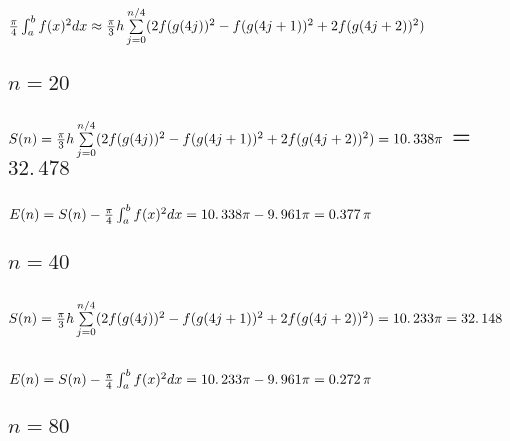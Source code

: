 \documentclass{article}
\begin{document}
\subsection{$\frac{\protect\pi }{4}\protect\int_{a}^{b}f(x)^{2}dx\approx 
\frac{\protect\pi }{3}h\sum%
\limits_{j=0}^{n/4}(2f(g(4j))^{2}-f(g(4j+1))^{2}+2f(g(4j+2))^{2})$}

\bigskip

\subsection{$n=20$}

\subsection{$S(n)=\frac{\protect\pi }{3}h\sum%
\limits_{j=0}^{n/4}(2f(g(4j))^{2}-f(g(4j+1))^{2}+2f(g(4j+2))^{2})=%
\allowbreak 10.\,\allowbreak 338\protect\pi $ = $32.\,\allowbreak 478$}

\subsection{$E(n)=S(n)-\frac{\protect\pi }{4}\protect\int%
_{a}^{b}f(x)^{2}dx=10.\,\allowbreak 338\protect\pi -\allowbreak
9.\,\allowbreak 961\protect\pi =\allowbreak 0.377\,\protect\pi $}

\bigskip

\subsection{$n=40$}

\subsection{$S(n)=\frac{\protect\pi }{3}h\sum%
\limits_{j=0}^{n/4}(2f(g(4j))^{2}-f(g(4j+1))^{2}+2f(g(4j+2))^{2})=%
\allowbreak 10.\,\allowbreak 233\protect\pi =\allowbreak 32.\,\allowbreak 148
$}

\subsection{$E(n)=S(n)-\frac{\protect\pi }{4}\protect\int_{a}^{b}f(x)^{2}dx=%
\allowbreak 10.\,\allowbreak 233\protect\pi -\allowbreak 9.\,\allowbreak 961%
\protect\pi =\allowbreak 0.272\,\protect\pi $}

\bigskip

\bigskip

\subsection{$n=80$}
\end{document}
